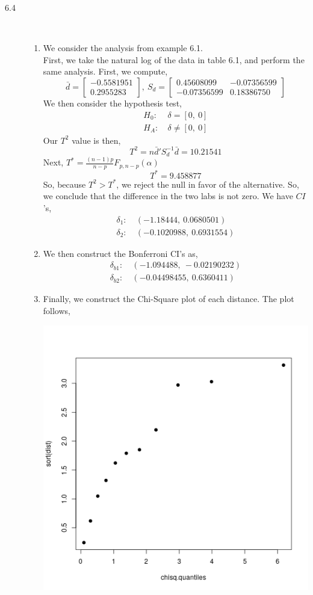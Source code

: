 \documentclass[letterpaper,10pt]{article}
\begin{document}
\begin{description}
\item[6.4]\hfill \\
\begin{enumerate}[label=\alph*.]
\item We consider the analysis from example 6.1.\\
First, we take the natural log of the data in table 6.1, and perform the same analysis. First, we compute,
\[\bar{d}=\begin{bmatrix}
-0.5581951\\0.2955283
\end{bmatrix},\ S_d=\begin{bmatrix}
0.45608099 & -0.07356599\\
-0.07356599 & 0.18386750
\end{bmatrix} \]
We then consider the hypothesis test,
\begin{align*}
H_0:&\ \delta=[0,\ 0]\\
H_A:&\ \delta\neq [0,\ 0]
\end{align*}
Our $T^2$ value is then,
\[T^2=n\bar{d}'S^{-1}_d\bar{d}=10.21541\]
Next, $T^*=\frac{(n-1)p}{n-p}F_{p,n-p}(\alpha)$
\[T^*=9.458877\]
So, because $T^2>T^*$, we reject the null in favor of the alternative. So, we conclude that the difference in the two labs is not zero. We have $CI$'s,
\begin{align*}
\delta_1: &\ (-1.18444,\ 0.0680501)\\
\delta_2: &\ (-0.1020988,\ 0.6931554)
\end{align*}
\item We then construct the Bonferroni CI's as,
\begin{align*}
\delta_{b1}: &\ (-1.094488,\ -0.02190232)\\
\delta_{b2}: &\ (-0.04498455,\ 0.6360411)
\end{align*}
\item Finally, we construct the Chi-Square plot of each distance. The plot follows,
\begin{center}
\includegraphics[scale=.75]{64chi.png}

\end{center}
\end{enumerate}
\end{description}
\end{document}
